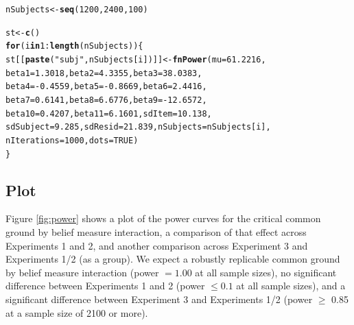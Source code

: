\documentclass{sp}\usepackage[]{graphicx}\usepackage[]{color}
\makeatletter
\newcommand{\hlnum}[1]{\textcolor[rgb]{0.686,0.059,0.569}{#1}}%
\newcommand{\hlstr}[1]{\textcolor[rgb]{0.192,0.494,0.8}{#1}}%
\newcommand{\hlopt}[1]{\textcolor[rgb]{0,0,0}{#1}}%
\newcommand{\hlstd}[1]{\textcolor[rgb]{0.345,0.345,0.345}{#1}}%
\newcommand{\hlkwa}[1]{\textcolor[rgb]{0.161,0.373,0.58}{\textbf{#1}}}%
\newcommand{\hlkwb}[1]{\textcolor[rgb]{0.69,0.353,0.396}{#1}}%
\newcommand{\hlkwc}[1]{\textcolor[rgb]{0.333,0.667,0.333}{#1}}%
\newcommand{\hlkwd}[1]{\textcolor[rgb]{0.737,0.353,0.396}{\textbf{#1}}}%
\newenvironment{kframe}{%
 \def\at@end@of@kframe{}%
 \ifinner\ifhmode%
  \def\at@end@of@kframe{\end{minipage}}%
  \begin{minipage}{\columnwidth}%
 \fi\fi%
 \def\FrameCommand##1{\hskip\@totalleftmargin \hskip-\fboxsep
 \colorbox{shadecolor}{##1}\hskip-\fboxsep
     \hskip-\linewidth \hskip-\@totalleftmargin \hskip\columnwidth}%
 \MakeFramed {\advance\hsize-\width
   \@totalleftmargin\z@ \linewidth\hsize
   \@setminipage}}%
 {\par\unskip\endMakeFramed%
 \at@end@of@kframe}
\newenvironment{knitrout}{}{} %
\makeatother
\begin{document}
\begin{knitrout}
\begin{kframe}
\begin{alltt}
\hlstd{nSubjects} \hlkwb{<-} \hlkwd{seq}\hlstd{(}\hlnum{1200}\hlstd{,} \hlnum{2400}\hlstd{,} \hlnum{100}\hlstd{)}

\hlstd{st} \hlkwb{<-} \hlkwd{c}\hlstd{()}
\hlkwa{for} \hlstd{(i} \hlkwa{in} \hlnum{1}\hlopt{:}\hlkwd{length}\hlstd{(nSubjects)) \{}
    \hlstd{st[[}\hlkwd{paste}\hlstd{(}\hlstr{"subj"}\hlstd{, nSubjects[i])]]} \hlkwb{<-} \hlkwd{fnPower}\hlstd{(}\hlkwc{mu} \hlstd{=} \hlnum{61.2216}\hlstd{,}
        \hlkwc{beta1} \hlstd{=} \hlnum{1.3018}\hlstd{,} \hlkwc{beta2} \hlstd{=} \hlnum{4.3355}\hlstd{,} \hlkwc{beta3} \hlstd{=} \hlnum{38.0383}\hlstd{,}
        \hlkwc{beta4} \hlstd{=} \hlopt{-}\hlnum{0.4559}\hlstd{,} \hlkwc{beta5} \hlstd{=} \hlopt{-}\hlnum{0.8669}\hlstd{,} \hlkwc{beta6} \hlstd{=} \hlnum{2.4416}\hlstd{,}
        \hlkwc{beta7} \hlstd{=} \hlnum{0.6141}\hlstd{,} \hlkwc{beta8} \hlstd{=} \hlnum{6.6776}\hlstd{,} \hlkwc{beta9} \hlstd{=} \hlopt{-}\hlnum{12.6572}\hlstd{,}
        \hlkwc{beta10} \hlstd{=} \hlnum{0.4207}\hlstd{,} \hlkwc{beta11} \hlstd{=} \hlnum{6.1601}\hlstd{,} \hlkwc{sdItem} \hlstd{=} \hlnum{10.138}\hlstd{,}
        \hlkwc{sdSubject} \hlstd{=} \hlnum{9.285}\hlstd{,} \hlkwc{sdResid} \hlstd{=} \hlnum{21.839}\hlstd{,} \hlkwc{nSubjects} \hlstd{= nSubjects[i],}
        \hlkwc{nIterations} \hlstd{=} \hlnum{1000}\hlstd{,} \hlkwc{dots} \hlstd{=} \hlnum{TRUE}\hlstd{)}
\hlstd{\}}
\end{alltt}
\end{kframe}
\end{knitrout}




\subsection{Plot}

Figure \ref{fig:power} shows a plot of the power curves for the critical common ground by belief measure interaction, a comparison of that effect across Experiments 1 and 2, and another comparison across Experiment 3 and Experiments 1/2 (as a group).  We expect a robustly replicable common ground by belief measure interaction (power $= 1.00$ at all sample sizes), no significant difference between Experiments 1 and 2 (power $\leq 0.1$ at all sample sizes), and a significant difference between Experiment 3 and Experiments 1/2 (power $\geq$ 0.85 at a sample size of 2100 or more).
\end{document}
